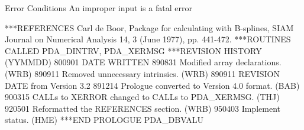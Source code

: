 \documentclass[11pt,twoside,nolof]{starlink}
\begin{document}
\begin{terminalv}
     Error Conditions
         An improper input is a fatal error

***REFERENCES  Carl de Boor, Package for calculating with B-splines,
                 SIAM Journal on Numerical Analysis 14, 3 (June 1977),
                 pp. 441-472.
***ROUTINES CALLED  PDA_DINTRV, PDA_XERMSG
***REVISION HISTORY  (YYMMDD)
   800901  DATE WRITTEN
   890831  Modified array declarations.  (WRB)
   890911  Removed unnecessary intrinsics.  (WRB)
   890911  REVISION DATE from Version 3.2
   891214  Prologue converted to Version 4.0 format.  (BAB)
   900315  CALLs to XERROR changed to CALLs to PDA_XERMSG.  (THJ)
   920501  Reformatted the REFERENCES section.  (WRB)
   950403  Implement status.  (HME)
***END PROLOGUE  PDA_DBVALU
\end{terminalv}








\end{document}
